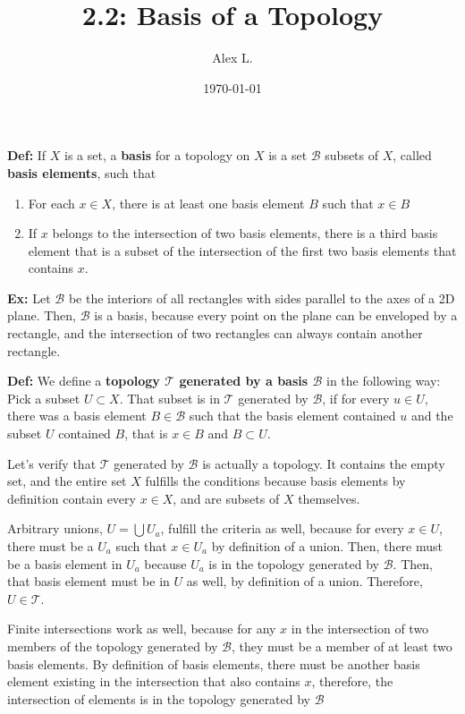 \documentclass{article}
\title{2.2: Basis of a Topology}
\author{Alex L.}
\date{\today}
\begin{document}
\maketitle
\textbf{Def:} If $X$ is a set, a \textbf{basis} for a topology on $X$ is a set $\mathcal{B}$ subsets of $X$, called \textbf{basis elements}, such that \begin{enumerate}
    \item For each $x \in X$, there is at least one basis element $B$ such that $x \in B$
    \item If $x$ belongs to the intersection of two basis elements, there is a third basis element that is a subset of the intersection of the first two basis elements that contains $x$. 
\end{enumerate}

\textbf{Ex:} Let $\mathcal{B}$ be the interiors of all rectangles with sides parallel to the axes of a 2D plane. Then, $\mathcal{B}$ is a basis, because every point on the plane can be enveloped by a rectangle, and the intersection of two rectangles can always contain another rectangle.

\textbf{Def:} We define a \textbf{topology $\mathcal{T}$ generated by a basis $\mathcal{B}$} in the following way: Pick a subset $U \subset X$. That subset is in $\mathcal{T}$ generated by $\mathcal{B}$, if for every $u \in U$, there was a basis element $B \in \mathcal{B}$ such that the basis element contained $u$ and the subset $U$ contained $B$, that is $x \in B$ and $B \subset U$.

Let's verify that $\mathcal{T}$ generated by $\mathcal{B}$ is actually a topology. It contains the empty set, and the entire set $X$ fulfills the conditions because basis elements by definition contain every $x \in X$, and are subsets of $X$ themselves. 

Arbitrary unions, $U = \bigcup U_a$, fulfill the criteria as well, because for every $x \in U$, there must be a $U_a$ such that $x\in U_a$ by definition of a union. Then, there must be a basis element in $U_a$ because $U_a$ is in the topology generated by $\mathcal{B}$. Then, that basis element must be in $U$ as well, by definition of a union. Therefore, $U \in \mathcal{T}$.

Finite intersections work as well, because for any $x$ in the intersection of two members of the topology generated by $\mathcal{B}$, they must be a member of at least two basis elements. By definition of basis elements, there must be another basis element existing in the intersection that also contains $x$, therefore, the intersection of elements is in the topology generated by $\mathcal{B}$
\end{document}
